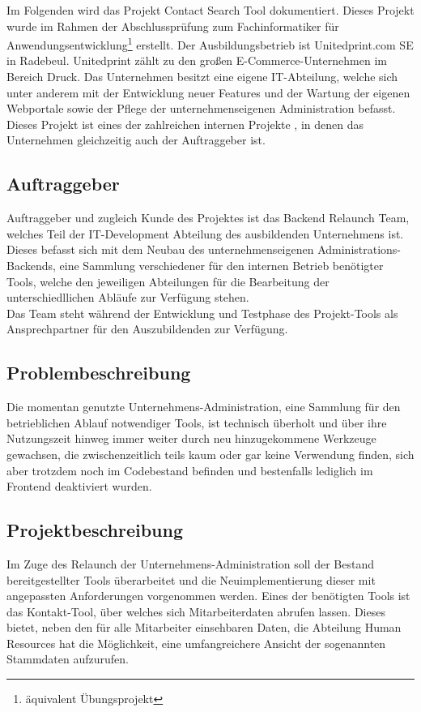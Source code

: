 Im Folgenden wird das Projekt \glqq Contact Search Tool\grqq{} dokumentiert. Dieses Projekt wurde im Rahmen der Abschlussprüfung zum Fachinformatiker für Anwendungsentwicklung\footnote{äquivalent Übungsprojekt} erstellt. Der Ausbildungsbetrieb ist Unitedprint.com SE in Radebeul. Unitedprint zählt zu den großen E-Commerce-Unternehmen im Bereich Druck. Das Unternehmen besitzt eine eigene IT-Abteilung, welche sich unter anderem mit der Entwicklung neuer Features und der Wartung der eigenen Webportale sowie der Pflege der unternehmenseigenen Administration befasst. Dieses Projekt ist eines der zahlreichen internen Projekte , in denen das Unternehmen gleichzeitig auch der Auftraggeber ist.\\

\subsection{Auftraggeber}
    Auftraggeber und zugleich Kunde des Projektes ist das Backend Relaunch Team, welches Teil der IT-Development Abteilung des ausbildenden Unternehmens ist. Dieses befasst sich mit dem Neubau des unternehmenseigenen Administrations-Backends, eine Sammlung verschiedener für den internen Betrieb benötigter Tools, welche den jeweiligen Abteilungen für die Bearbeitung der unterschiedllichen Abläufe zur Verfügung stehen.\\
    Das Team steht während der Entwicklung und Testphase des Projekt-Tools als Ansprechpartner für den Auszubildenden zur Verfügung.

\subsection{Problembeschreibung}
    Die momentan genutzte Unternehmens-Administration, eine Sammlung für den betrieblichen Ablauf notwendiger Tools, ist technisch überholt und über ihre Nutzungszeit hinweg immer weiter durch neu hinzugekommene Werkzeuge  gewachsen, die zwischenzeitlich teils kaum oder gar keine Verwendung finden, sich aber trotzdem noch im Codebestand befinden und bestenfalls lediglich im Frontend deaktiviert wurden.

\subsection{Projektbeschreibung}
    Im Zuge des Relaunch der Unternehmens-Administration soll der Bestand bereitgestellter Tools überarbeitet und die Neuimplementierung dieser mit angepassten Anforderungen vorgenommen werden. Eines der benötigten Tools ist das Kontakt-Tool, über welches sich Mitarbeiterdaten abrufen lassen. Dieses bietet, neben den für alle Mitarbeiter einsehbaren Daten, die Abteilung Human Resources hat die Möglichkeit, eine umfangreichere Ansicht der sogenannten Stammdaten aufzurufen.

